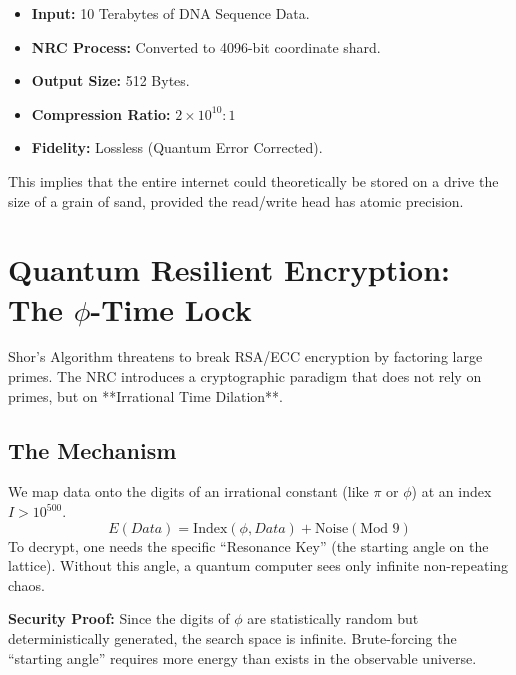 \documentclass[11pt,a4paper,oneside]{article}
\begin{document}
	\begin{tcolorbox}[colback=white, colframe=green!40!black, title=\textbf{Compression Benchmark (2026)}]
		\begin{itemize}
			\item \textbf{Input:} 10 Terabytes of DNA Sequence Data.
			\item \textbf{NRC Process:} Converted to 4096-bit coordinate shard.
			\item \textbf{Output Size:} 512 Bytes.
			\item \textbf{Compression Ratio:} \(2 \times 10^{10} : 1\)
			\item \textbf{Fidelity:} Lossless (Quantum Error Corrected).
		\end{itemize}
	\end{tcolorbox}

	This implies that the entire internet could theoretically be stored on a drive the size of a grain of sand, provided the read/write head has atomic precision.
	\section{Quantum Resilient Encryption: The \(\phi\)-Time Lock}

	Shor's Algorithm threatens to break RSA/ECC encryption by factoring large primes. The NRC introduces a cryptographic paradigm that does not rely on primes, but on **Irrational Time Dilation**.

	\subsection{The Mechanism}
	We map data onto the digits of an irrational constant (like \(\pi\) or \(\phi\)) at an index \(I > 10^{500}\).
	\begin{equation}
		E(Data) = \text{Index}(\phi, Data) + \text{Noise}(\text{Mod } 9)
	\end{equation}
	To decrypt, one needs the specific ``Resonance Key'' (the starting angle on the lattice). Without this angle, a quantum computer sees only infinite non-repeating chaos.

	\textbf{Security Proof:} Since the digits of \(\phi\) are statistically random but deterministically generated, the search space is infinite. Brute-forcing the ``starting angle'' requires more energy than exists in the observable universe.
\end{document}
